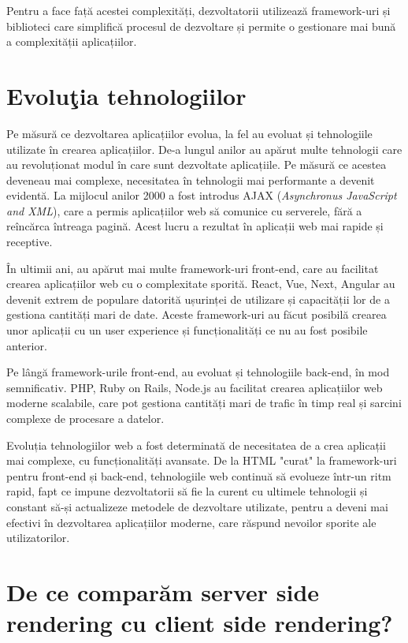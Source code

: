 \documentclass[12pt, a4paper]{report}
\begin{document}
Pentru a face față acestei complexități, dezvoltatorii utilizează framework-uri și biblioteci care simplifică procesul de dezvoltare și permite o gestionare mai bună a complexității aplicațiilor.

\section{Evolu\c tia tehnologiilor}

Pe măsură ce dezvoltarea aplicațiilor evolua, la fel au evoluat și tehnologiile utilizate în crearea aplicațiilor. De-a lungul anilor au apărut multe tehnologii care au revoluționat modul în care sunt dezvoltate aplicațiile. Pe măsură ce acestea deveneau mai complexe, necesitatea în tehnologii mai performante a devenit evidentă. La mijlocul anilor 2000 a fost introdus AJAX (\emph{Asynchronus JavaScript and XML}), care a permis aplicațiilor web să comunice cu serverele, fără a reîncărca întreaga pagină. Acest lucru a rezultat în aplicații web mai rapide și receptive.

În ultimii ani, au apărut mai multe framework-uri front-end, care au facilitat crearea aplicațiilor web cu o complexitate sporită. React, Vue, Next, Angular au devenit extrem de populare datorită ușurinței de utilizare și capacității lor de a gestiona cantități mari de date. Aceste framework-uri au făcut posibilă crearea unor aplicații cu un user experience și funcționalități ce nu au fost posibile anterior.

Pe lângă framework-urile front-end, au evoluat și tehnologiile back-end, în mod semnificativ. PHP, Ruby on Rails, Node.js au facilitat crearea aplicațiilor web moderne scalabile, care pot gestiona cantități mari de trafic în timp real și sarcini complexe de procesare a datelor.

Evoluția tehnologiilor web a fost determinată de necesitatea de a crea aplicații mai complexe, cu funcționalități avansate. De la HTML "curat" la framework-uri pentru front-end și back-end, tehnologiile web continuă să evolueze într-un ritm rapid, fapt ce impune dezvoltatorii să fie la curent cu ultimele tehnologii și constant să-și actualizeze metodele de dezvoltare utilizate, pentru a deveni mai efectivi în dezvoltarea aplicațiilor moderne, care răspund nevoilor sporite ale utilizatorilor.



\section{De ce compar\u am server side rendering cu client side rendering?}
\end{document}
